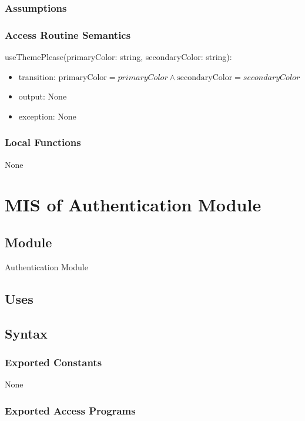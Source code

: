 \documentclass[12pt, titlepage]{article}
\begin{document}
\subsubsection{Assumptions}

\subsubsection{Access Routine Semantics}

\noindent useThemePlease(primaryColor: string, secondaryColor: string):
\begin{itemize}
\item transition: $\text{primaryColor} = primaryColor \land \text{secondaryColor} = secondaryColor$
\item output: None 
\item exception: None
\end{itemize}

\subsubsection{Local Functions}

None

\newpage

\section{MIS of Authentication Module} \label{mAuth}

\subsection{Module}

Authentication Module

\subsection{Uses}


\subsection{Syntax}

\subsubsection{Exported Constants}

None

\subsubsection{Exported Access Programs}
\end{document}
